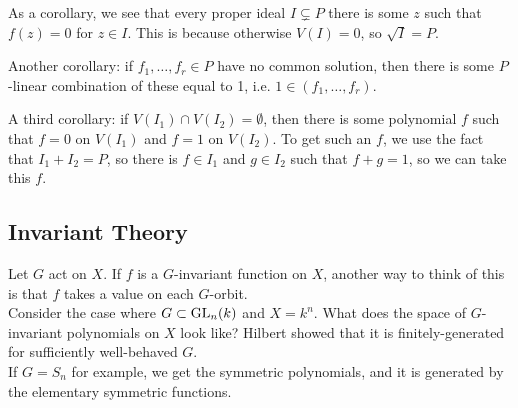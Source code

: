 \documentclass{amsart}
\begin{document}
As a corollary, we see that every proper ideal $I\subsetneq P$ there is some $z$ such that $f(z)=0$ for $z\in I$. This is because otherwise $V(I)=0$, so $\sqrt{I}=P$.

Another corollary: if $f_1,\dots,f_r\in P$ have no common solution, then there is some $P$-linear combination of these equal to 1, i.e. $1\in (f_1,\dots,f_r)$.

A third corollary: if $V(I_1)\cap V(I_2)=\emptyset$, then there is some polynomial $f$ such that $f=0$ on $V(I_1)$ and $f=1$ on $V(I_2)$. To get such an $f$, we use the fact that $I_1+I_2=P$, so there is $f\in I_1$ and $g\in I_2$ such that $f+g=1$, so we can take this $f$.\\

\subsection{Invariant Theory} Let $G$ act on $X$. If $f$ is a $G$-invariant function on $X$, another way to think of this is that $f$ takes a value on each $G$-orbit.\\

Consider the case where $G\subset \operatorname{GL}_n(k)$ and $X=k^n$. What does the space of $G$-invariant polynomials on $X$ look like? Hilbert showed that it is finitely-generated for sufficiently well-behaved $G$.\\

If $G=S_n$ for example, we get the symmetric polynomials, and it is generated by the elementary symmetric functions.
\end{document}
